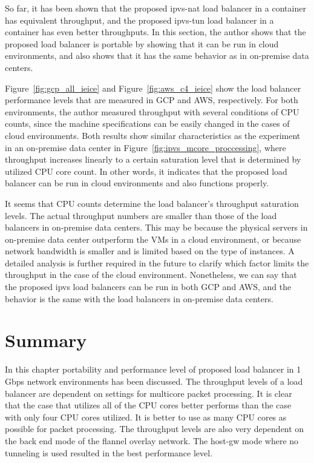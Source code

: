 So far, it has been shown that the proposed ipvs-nat load balancer in a container has equivalent throughput, and the proposed ipvs-tun load balancer in a container has even better throughputs.
In this section, the author shows that the proposed load balancer is portable by showing that it can be run in cloud environments, and also shows that it has the same behavior as in on-premise data centers.

Figure~\ref{fig:gcp_all_ieice} and Figure~\ref{fig:aws_c4_ieice} show the load balancer performance levels that are measured in GCP and AWS, respectively.
For both environments, the author measured throughput with several conditions of CPU counts, since the machine specifications can be easily changed in the cases of cloud environments.
Both results show similar characteristics as the experiment in an on-premise data center in Figure~\ref{fig:ipvs_mcore_proccessing}, where throughput increases linearly to a certain saturation level that is determined by utilized CPU core count.
In other words, it indicates that the proposed load balancer can be run in cloud environments and also functions properly.

It seems that CPU counts determine the load balancer's throughput saturation levels.
The actual throughput numbers are smaller than those of the load balancers in on-premise data centers.
This may be because the physical servers in on-premise data center outperform the VMs in a cloud environment, or because network bandwidth is smaller and is limited based on the type of instances.
A detailed analysis is further required in the future to clarify which factor limits the throughput in the case of the cloud environment.
Nonetheless, we can say that the proposed ipvs load balancers can be run in both GCP and AWS, and the behavior is the same with the load balancers in on-premise data centers.


\FloatBarrier

\section{Summary}

In this chapter portability and performance level of proposed load balancer in 1 Gbps network environments has been discussed.
The throughput levels of a load balancer are dependent on settings for multicore packet processing.
It is clear that the case that utilizes all of the CPU cores better performs than the case with only four CPU cores utilized.
It is better to use as many CPU cores as possible for packet processing.
The throughput levels are also very dependent on the back end mode of the flannel overlay network.
The host-gw mode where no tunneling is used resulted in the best performance level.


